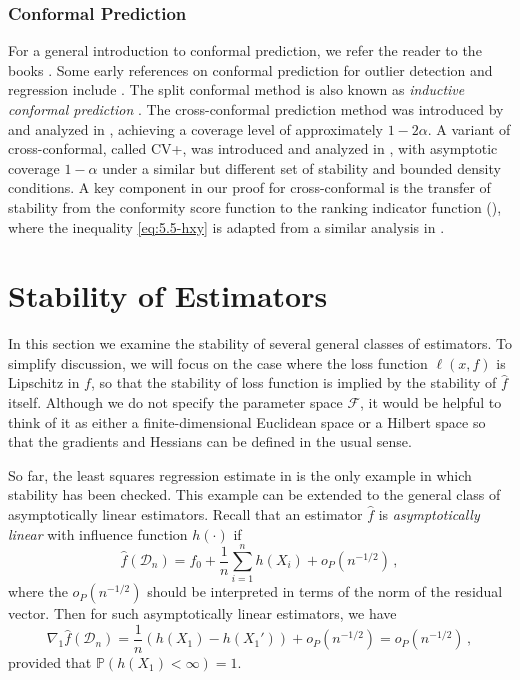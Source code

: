 \documentclass[11pt]{article}
\theoremstyle{plain}
\newcommand{\D}{{\mathcal{D}}}
\begin{document}
\subsubsection{Conformal Prediction}
For a general  introduction to conformal prediction, we refer the reader to the books \cite{VovkGS05,angelopoulos2024theoretical}.  Some early references on conformal prediction for outlier detection and regression include \cite{LeiRW13,LeiW14,lei2018distribution}.  The split conformal method is also known as \emph{inductive conformal prediction} \citep{papadopoulos2002inductive,LeiRW14}.  The cross-conformal prediction method was introduced by \cite{vovk2015cross} and analyzed in \cite{vovk2018cross}, achieving a coverage level of approximately $1-2\alpha$.   A variant of cross-conformal, called CV+, was introduced and analyzed in \cite{barber2021predictive}, with asymptotic coverage $1-\alpha$ under a similar but different set of stability  and bounded density conditions.  A key component in our proof for cross-conformal is the transfer of stability from the conformity score function to the ranking indicator function (), where the inequality \eqref{eq:5.5-hxy} is adapted from a similar analysis in \cite{hu2024two}.



\newpage

\section{Stability of Estimators}\label{sec:6-stability}
In this section we examine the stability of several general classes of estimators. To simplify discussion, we will focus on the case where the loss function $\ell(x,f)$ is Lipschitz in $f$, so that the stability of loss function is implied by the stability of $\hat f$ itself.  Although we do not specify the parameter space $\mathcal F$, it would be helpful to think of it as either a finite-dimensional Euclidean space or a Hilbert space so that the gradients and Hessians can be defined in the usual sense.


So far, the least squares regression estimate in  is the only example in which stability has been checked.  This example can be extended to the general class of asymptotically linear estimators.  Recall that an estimator $\hat f$ is \emph{asymptotically linear} with influence function $h(\cdot)$ if
$$
\hat f(\D_n) = f_0+\frac{1}{n}\sum_{i=1}^n h(X_i)+o_P(n^{-1/2})\,,
$$
where the $o_P(n^{-1/2})$ should be interpreted in terms of the norm of the residual vector.   Then for such asymptotically linear estimators, we have
$$\nabla_1 \hat f(\D_n)=\frac{1}{n}(h(X_1)-h(X_1'))+o_P(n^{-1/2})=o_P(n^{-1/2})\,,$$
provided that $\mathbb P(h(X_1)<\infty)=1$.
\end{document}
